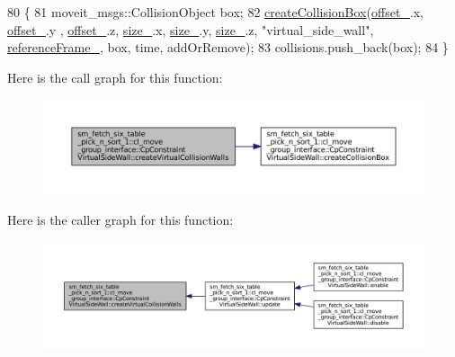 \begin{DoxyCode}
80         \{
81             moveit\_msgs::CollisionObject box;
82             \hyperlink{classsm__fetch__six__table__pick__n__sort__1_1_1cl__move__group__interface_1_1CpConstraintVirtualSideWall_a1d7e720febc886a8b140eec81b2b397f}{createCollisionBox}(\hyperlink{classsm__fetch__six__table__pick__n__sort__1_1_1cl__move__group__interface_1_1CpConstraintVirtualSideWall_aed69dc67bef1900a254e55031244a881}{offset\_}.x, \hyperlink{classsm__fetch__six__table__pick__n__sort__1_1_1cl__move__group__interface_1_1CpConstraintVirtualSideWall_aed69dc67bef1900a254e55031244a881}{offset\_}.y , 
      \hyperlink{classsm__fetch__six__table__pick__n__sort__1_1_1cl__move__group__interface_1_1CpConstraintVirtualSideWall_aed69dc67bef1900a254e55031244a881}{offset\_}.z, \hyperlink{classsm__fetch__six__table__pick__n__sort__1_1_1cl__move__group__interface_1_1CpConstraintVirtualSideWall_ad2633a49d0ab512b901fc5b63aae26f1}{size\_}.x, \hyperlink{classsm__fetch__six__table__pick__n__sort__1_1_1cl__move__group__interface_1_1CpConstraintVirtualSideWall_ad2633a49d0ab512b901fc5b63aae26f1}{size\_}.y, \hyperlink{classsm__fetch__six__table__pick__n__sort__1_1_1cl__move__group__interface_1_1CpConstraintVirtualSideWall_ad2633a49d0ab512b901fc5b63aae26f1}{size\_}.z, \textcolor{stringliteral}{"virtual\_side\_wall"}, 
      \hyperlink{classsm__fetch__six__table__pick__n__sort__1_1_1cl__move__group__interface_1_1CpConstraintVirtualSideWall_ac40d9e21604237c88121c3d4b116ce39}{referenceFrame\_}, box, time, addOrRemove);
83             collisions.push\_back(box);
84         \}
\end{DoxyCode}
Here is the call graph for this function\+:
\nopagebreak
\begin{figure}[H]
\begin{center}
\leavevmode
\includegraphics[width=350pt]{classsm__fetch__six__table__pick__n__sort__1_1_1cl__move__group__interface_1_1CpConstraintVirtualSideWall_a7955eab48e3804a396bd91092c59094b_cgraph}
\end{center}
\end{figure}
Here is the caller graph for this function\+:
\nopagebreak
\begin{figure}[H]
\begin{center}
\leavevmode
\includegraphics[width=350pt]{classsm__fetch__six__table__pick__n__sort__1_1_1cl__move__group__interface_1_1CpConstraintVirtualSideWall_a7955eab48e3804a396bd91092c59094b_icgraph}
\end{center}
\end{figure}
